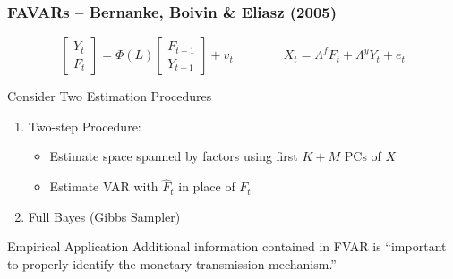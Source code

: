 \documentclass[handout]{beamer}
\begin{document}
\begin{frame}[c]\frametitle{FAVARs -- Bernanke, Boivin \& Eliasz (2005)}

\small
$$\boxed{\quad \left[\begin{array}
			{c} Y_t \\ F_t
		\end{array} \right] = \Phi(L)\left[\begin{array}
			{c} F_{t-1} \\ Y_{t-1}
		\end{array} \right] + v_t \quad \quad \quad \quad
		 X_t = \Lambda^f F_t + \Lambda^y Y_t + e_t \quad}$$
\normalsize

\begin{block}{Consider Two Estimation Procedures}
	\begin{enumerate}
		\item Two-step Procedure:\begin{itemize}
			\item Estimate space spanned by factors using first $K + M$ PCs of $X$
			\item Estimate VAR with $\widehat{F}_t$ in place of $F_t$
		\end{itemize}
		\item Full Bayes (Gibbs Sampler)
	\end{enumerate}
\end{block}

\begin{block}{Empirical Application}
Additional information contained in FVAR is ``important to properly identify the monetary transmission mechanism.''
\end{block}
\end{frame}
\end{document}
